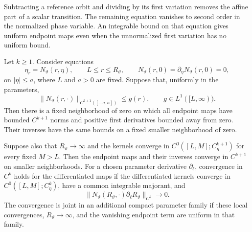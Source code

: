 Subtracting a reference orbit and dividing by its first variation removes
the affine part of a scalar transition. The remaining equation vanishes
to second order in the normalized phase variable. An integrable bound on that
equation gives uniform endpoint maps even when the unnormalized first
variation has no uniform bound.

\begin{lemma}\label{lem:scalar-normalization}
Let \(k\ge1\). Consider equations
\[
 \eta_r=N_\vartheta(r,\eta),\qquad L\le r\le R_\vartheta,
 \qquad N_\vartheta(r,0)=\partial_\eta N_\vartheta(r,0)=0,
\]
on \(|\eta|\le a\), where \(L\) and \(a>0\) are fixed.
Suppose that, uniformly in the parameters,
\[
 \|N_\vartheta(r,\cdot)\|_{C^{k+1}([-a,a])}\le g(r),
 \qquad g\in L^1([L,\infty)).
\]
Then there is a fixed neighborhood of zero on which all endpoint
maps have bounded \(C^{k+1}\) norms and positive first derivatives
bounded away from zero. Their inverses have the same bounds on a
fixed smaller neighborhood of zero.

Suppose also that \(R_\vartheta\to\infty\) and the kernels converge
in \(C^0([L,M];C^{k+1}_\eta)\) for every fixed \(M>L\).
Then the endpoint maps
and their inverses converge in \(C^{k+1}\) on smaller neighborhoods.
For a chosen parameter derivative \(\partial_\ell\), convergence
in \(C^k\) holds for the differentiated maps if the differentiated
kernels converge in \(C^0([L,M];C^k_\eta)\), have a common integrable
majorant, and
\[
 \|N_\vartheta(R_\vartheta,\cdot)
               \partial_\ell R_\vartheta\|_{C^k}\longrightarrow0.
\]
The convergence is joint in an additional compact parameter family
if these local convergences, \(R_\vartheta\to\infty\), and the
vanishing endpoint term are uniform in that family.
\end{lemma}
